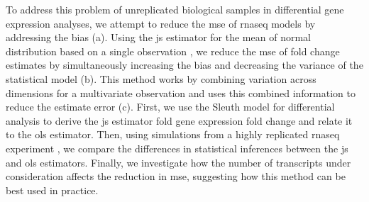 To address this problem of unreplicated biological samples in differential gene expression analyses, we attempt to reduce the \gls{mse} of \gls{rnaseq} models by addressing the bias (a).
Using the \gls{js} estimator for the mean of normal distribution based on a single observation \cite{steinInadmissibilityUsualEstimator1956,bockMinimaxEstimatorsMean1975,steinEstimationMeanMultivariate1981}, we reduce the \gls{mse} of fold change estimates by simultaneously increasing the bias and decreasing the variance of the statistical model (b).
This method works by combining variation across dimensions for a multivariate observation and uses this combined information to reduce the estimate error (c).
First, we use the Sleuth model \cite{pimentelDifferentialAnalysisRNAseq2017,yiGenelevelDifferentialAnalysis2018} for differential analysis to derive the \gls{js} estimator fold gene expression fold change and relate it to the \gls{ols} estimator.
Then, using simulations from a highly replicated \gls{rnaseq} experiment \cite{gierlinskiStatisticalModelsRNAseq2015}, we compare the differences in statistical inferences between the \gls{js} and \gls{ols} estimators.
Finally, we investigate how the number of transcripts under consideration affects the reduction in \gls{mse}, suggesting how this method can be best used in practice.


